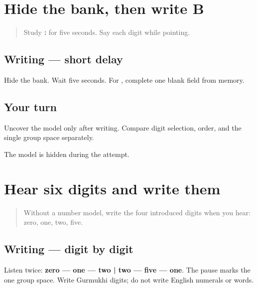 \section[\texorpdfstring{\pa{ਫ਼ੋਨ}: \pa{੦੨੫} \pa{੧੨੫} (delayed phone-field entry)}{ਫ਼ੋਨ: ੦੨੫ ੧੨੫ (delayed phone-field entry)}]{Hide the bank, then write B}

\label{lesson:PA-W08-phone-delayed}



\begin{quote}
Study \textbf{:  } for five seconds. Say each digit while pointing.
\end{quote}

\subsection*{Writing — short delay}
Hide the bank. Wait five seconds. For \textbf{}, complete one blank \textbf{} field from memory.

\subsection*{Your turn}
Uncover the model only after writing. Compare digit selection, order, and the single group space separately.

\begin{tcolorbox}[breakable,colback=teal!4,colframe=teal!35!black,title={Before you move on}]
The model is hidden during the attempt.
\end{tcolorbox}
\section[\texorpdfstring{\pa{੦੧੨} \pa{੨੫੧} (heard digit string)}{੦੧੨ ੨੫੧ (heard digit string)}]{Hear six digits and write them}

\label{lesson:PA-W08-phone-dictation}



\begin{quote}
Without a number model, write the four introduced digits when you hear: zero, one, two, five.
\end{quote}

\subsection*{Writing — digit by digit}
Listen twice: \textbf{zero — one — two | two — five — one}. The pause marks the one group space. Write Gurmukhi digits; do not write English numerals or words.

